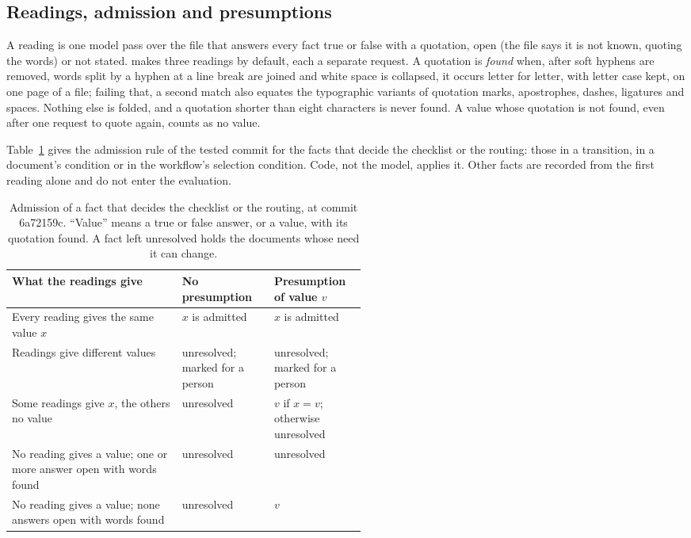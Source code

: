 \subsection{Readings, admission and presumptions}
\label{sec:admission}

A reading is one model pass over the file that answers every fact true or false with a quotation, open (the file says it is not known, quoting the words) or not stated. \casepath makes three readings by default, each a separate request. A quotation is \emph{found} when, after soft hyphens are removed, words split by a hyphen at a line break are joined and white space is collapsed, it occurs letter for letter, with letter case kept, on one page of a file; failing that, a second match also equates the typographic variants of quotation marks, apostrophes, dashes, ligatures and spaces. Nothing else is folded, and a quotation shorter than eight characters is never found. A value whose quotation is not found, even after one request to quote again, counts as no value.

Table~\ref{tab:admission} gives the admission rule of the tested commit for the facts that decide the checklist or the routing: those in a transition, in a document's condition or in the workflow's selection condition. Code, not the model, applies it. Other facts are recorded from the first reading alone and do not enter the evaluation.

\begin{table}[t]
\caption{Admission of a fact that decides the checklist or the routing, at commit 6a72159c. ``Value'' means a true or false answer, or a value, with its quotation found. A fact left unresolved holds the documents whose need it can change.}
\label{tab:admission}
\footnotesize
\begin{tabularx}{\linewidth}{@{}>{\raggedright\arraybackslash}X>{\raggedright\arraybackslash}p{0.26\linewidth}>{\raggedright\arraybackslash}p{0.26\linewidth}@{}}
\toprule
What the readings give & No presumption & Presumption of value $v$ \\
\midrule
Every reading gives the same value $x$ & $x$ is admitted & $x$ is admitted \\
Readings give different values & unresolved; marked for a person & unresolved; marked for a person \\
Some readings give $x$, the others no value & unresolved & $v$ if $x=v$; otherwise unresolved \\
No reading gives a value; one or more answer open with words found & unresolved & unresolved \\
No reading gives a value; none answers open with words found & unresolved & $v$ \\
\bottomrule
\end{tabularx}
\end{table}


